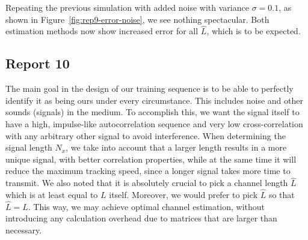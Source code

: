 \documentclass[11pt,titlepage]{report}
\begin{document}

Repeating the previous simulation with added noise with variance $\sigma = 0.1$, as shown in Figure~\ref{fig:rep9-error-noise}, we see nothing spectacular. Both estimation methods now show increased error for all $\hat{L}$, which is to be expected. 

\subsection{Report 10}
The main goal in the design of our training sequence is to be able to perfectly identify it as being ours under every circumstance. This includes noise and other sounds (signals) in the medium. To accomplish this, we want the signal itself to have a high, impulse-like autocorrelation sequence and very low cross-correlation with any arbitrary other signal to avoid interference.
When determining the signal length $N_x$, we take into account that a larger length results in a more unique signal, with better correlation properties, while at the same time it will reduce the maximum tracking speed, since a longer signal takes more time to transmit.
We also noted that it is absolutely crucial to pick a channel length $\hat{L}$ which is at least equal to $L$ itself. Moreover, we would prefer to pick $\hat{L}$ so that $\hat{L} = L$. This way, we may achieve optimal channel estimation, without introducing any calculation overhead due to matrices that are larger than necessary.
\end{document}
